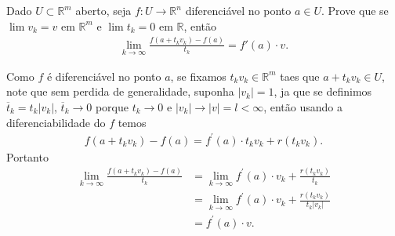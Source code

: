 \begin{homeworkProblem}
  Dado $U \subset \mathbb{R}^m$ aberto, seja $f : U \to \mathbb{R}^n$ diferenciável no ponto $a \in U$. Prove que se $\lim v_k = v$ em $\mathbb{R}^m$ e $\lim t_k = 0$ em $\mathbb{R}$, então
  \begin{align*}
    \lim_{k\to\infty} \frac{f(a+t_k v_k)-f(a)}{t_k} = f'(a)\cdot v.   
  \end{align*}
  \begin{solution}
    Como $f$ é diferenciável no ponto $a$, se fixamos $t_kv_k\in\mathbb{R}^{m}$ taes que $a+t_kv_k\in U$, note que sem perdida de generalidade, suponha $|v_k|=1$, ja que se definimos $\overline{t}_k=t_k|v_k|$, $\overline{t}_k\to 0$ porque $t_k\to 0$ e $|v_k|\to|v|=l<\infty$, então usando a diferenciabilidade do $f$ temos 
    \begin{align*}
      f(a+t_kv_k)-f(a)=f^{\prime}(a)\cdot t_kv_k + r(t_kv_k).
    \end{align*}
    Portanto
    \begin{align*}
      \lim_{k \to \infty}\frac{f(a+t_kv_k)-f(a)}{t_k}&=\lim_{k \to \infty}f^{\prime}(a)\cdot v_k+\frac{r(t_kv_k)}{t_k}\\
      &=\lim_{k \to \infty}f^{\prime}(a)\cdot v_k+\frac{r(t_kv_k)}{t_k|v_k|}\\
      &=f^{\prime}(a)\cdot v.
    \end{align*}
  \end{solution}
\end{homeworkProblem}
